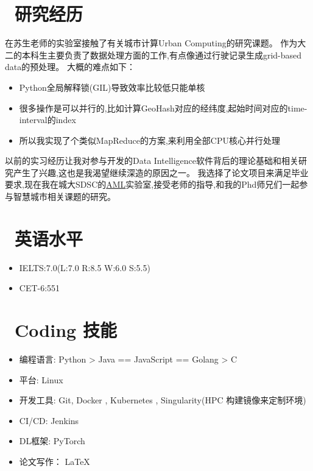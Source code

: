 \documentclass{resume}
\begin{document}
\section{\faUsers\ 研究经历}
在苏生老师的实验室接触了有关城市计算Urban Computing的研究课题。
作为大二的本科生主要负责了数据处理方面的工作,有点像通过行驶记录生成grid-based data的预处理。
大概的难点如下：
\begin{itemize}
  \item Python全局解释锁(GIL)导致效率比较低只能单核
  \item 很多操作是可以并行的,比如计算GeoHash对应的经纬度,起始时间对应的time-interval的index
  \item 所以我实现了个类似MapReduce的方案,来利用全部CPU核心并行处理
\end{itemize}

以前的实习经历让我对参与开发的Data Intelligence软件背后的理论基础和相关研究产生了兴趣,这也是我渴望继续深造的原因之一。
我选择了论文项目来满足毕业要求,现在我在城大SDSC的\href{https://aml-cityu.github.io/team/}{AML}实验室,接受\href{https://www.cityu.edu.hk/stfprofile/xyzhao.htm}{\color{blue}{赵翔宇}}老师的指导,和我的Phd师兄们一起参与智慧城市相关课题的研究。


\section{\faInfo\ 英语水平}
\begin{itemize}[parsep=0.5ex]
  \item IELTS:7.0(L:7.0 R:8.5 W:6.0 S:5.5)
  \item CET-6:551
\end{itemize}
\section{\faCogs\ Coding 技能}
\begin{itemize}[parsep=0.5ex]
  \item 编程语言: Python > Java == JavaScript == Golang > C
  \item 平台: Linux
  \item 开发工具: Git, Docker , Kubernetes , Singularity(HPC 构建镜像来定制环境)
  \item CI/CD: Jenkins
  \item DL框架: PyTorch
  \item 论文写作： \LaTeX
\end{itemize}
\end{document}
